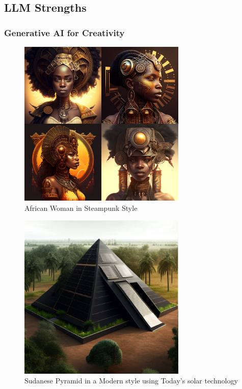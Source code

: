 \subsection{LLM Strengths}
\subsubsection{Generative AI for Creativity}

\begin{figure}[ht]
    \includegraphics[width=8cm]{imgs/african_woman_steampunk.eps}
    \caption{African Woman in Steampunk Style}
\end{figure}

\begin{figure}[ht]
    \includegraphics[width=8cm]{imgs/sudanese_solar_pyramid.eps}
    \caption{Sudanese Pyramid in a Modern style using Today's solar technology}
\end{figure}